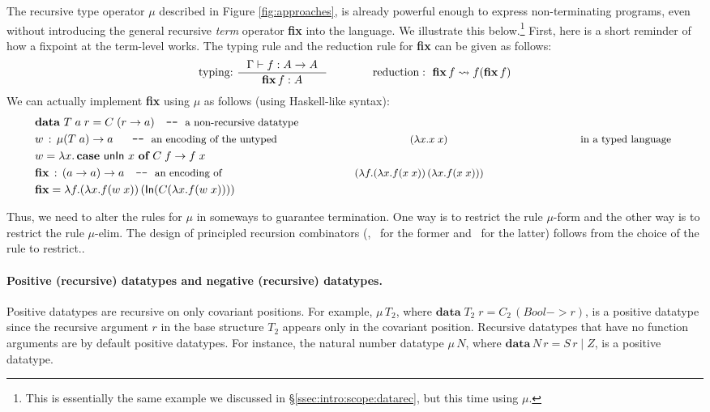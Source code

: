 The recursive type operator $\mu$ described in Figure \ref{fig:approaches},
is already powerful enough to express non-terminating programs, even without
introducing the general recursive {\em term} operator \textbf{fix}
into the language. We illustrate this below.\footnote{This is essentially
        the same example we discussed in \S\ref{ssec:intro:scope:datarec},
        but this time using $\mu$.}
First, here is a short reminder of how a fixpoint at the term-level works.
The typing rule and the reduction rule for \textbf{fix} can be given as follows:
\[ \text{typing:}~ \inference{\Gamma |- f : A -> A}{\textbf{fix}\,f : A}
 \qquad\qquad
   \text{reduction}:~ \textbf{fix}\,f \rightsquigarrow f(\textbf{fix}\,f)
\]
We can actually implement \textbf{fix} using $\mu$ as follows
(using Haskell-like syntax):
\begin{align*}
& \textbf{data}~T\;a\;r = C\;(r -> a) \quad
          \texttt{-}\texttt{-}~\text{\small a non-recursive datatype} \\
& w \,:\, \mu(T\;a) -> a ~~ \quad
          \texttt{-}\texttt{-}~\text{\small an encoding of the untyped
                                     $(\lambda x.x\;x)$
                                     in a typed language}~ \\
& w = \lambda x . \,\textbf{case}~\mathsf{unIn}~x~\textbf{of}~C\;f -> f\;x \\
& \textbf{fix} \,:\, (a -> a) -> a \quad
          \texttt{-}\texttt{-}~\text{\small an encoding of 
                                     $(\lambda f.(\lambda x.f(x\;x))\,
                                                 (\lambda x.f(x\;x)))$} \\
& \textbf{fix} = \lambda f. (\lambda x. f (w\;x))\,(\mathsf{In}(C(\lambda x. f (w\;x))))
\end{align*}

Thus, we need to alter the rules for $\mu$ in someways to guarantee termination.
One way is to restrict the rule {\small $\mu$-form} and
the other way is to restrict the rule {\small $\mu$-elim}.
The design of principled recursion combinators (\eg, \It\ for the former
and \MIt\ for the latter) follows from the choice of the rule to restrict..

\paragraph{Positive (recursive) datatypes and negative (recursive) datatypes.}
Positive datatypes are recursive on only covariant positions.
For example, $\mu\,T_2$, where $\textbf{data}\;T_2 \; r = C_2\,(Bool -> r)$,
is a positive datatype since the recursive argument $r$ in
the base structure $T_2$ appears only in the covariant position.
Recursive datatypes that have no function arguments are by default
positive datatypes. For instance, the natural number datatype $\mu\,N$,
where $\textbf{data}\,N\,r=S\,r \mid Z$, is a positive datatype.

